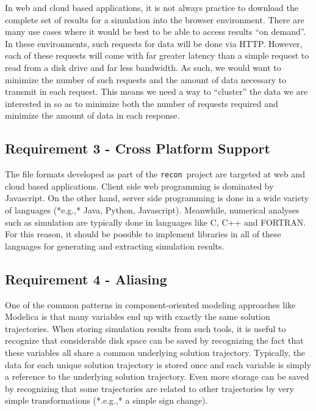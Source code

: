 \documentclass[11pt,a4paper,onecolumn]{article}
\newcommand{\recon}{\texttt{recon}}
\begin{document}

In web and cloud based applications, it is not always practice to
download the complete set of results for a simulation into the browser
environment.  There are many use cases where it would be best to be
able to access results ``on demand''.  In these environments, such
requests for data will be done via HTTP\cite{HTTP}.  However, each of
these requests will come with far greater latency than a simple
request to read from a disk drive and far less bandwidth.  As such, we
would want to minimize the number of such requests and the amount of
data necessary to transmit in each request.  This means we need a way
to ``cluster'' the data we are interested in so as to minimize both
the number of requests required and minimize the amount of data in
each response.

\subsection{Requirement 3 - Cross Platform Support}


The file formats developed as part of the \recon\ project are targeted
at web and cloud based applications.  Client side web programming is
dominated by Javascript.  On the other hand, server side programming
is done in a wide variety of languages (*e.g.,* Java, Python,
Javascript).  Meanwhile, numerical analyses such as simulation are
typically done in languages like C, C++ and FORTRAN.  For this reason,
it should be possible to implement libraries in all of these languages
for generating and extracting simulation results.

\subsection{Requirement 4 - Aliasing}


One of the common patterns in component-oriented modeling approaches
like Modelica is that many variables end up with exactly the same
solution trajectories.  When storing simulation results from such
tools, it is useful to recognize that considerable disk space can be
saved by recognizing the fact that these variables all share a common
underlying solution trajectory.  Typically, the data for each unique
solution trajectory is stored once and each variable is simply a
reference to the underlying solution trajectory.  Even more storage
can be saved by recognizing that some trajectories are related to
other trajectories by very simple transformations (*.e.g.,* a simple
sign change).
\end{document}
